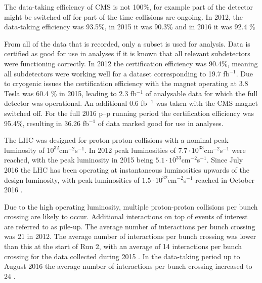 The data-taking efficiency of CMS is not 100\%, for example part of the detector might be
switched off for part of the time collisions are ongoing. In 2012, the data-taking 
efficiency was 93.5\%, in 2015 it was 90.3\% and in 2016 it was 92.4 \%

From all of the data that is recorded, only a subset is used for analysis. Data is 
certified as good for use in analyses if it is known that all relevant subdetectors
were functioning correctly. In 2012 the certification efficiency was 90.4\%,
meaning all subdetectors were working well for a dataset corresponding to 19.7 fb$^{-1}$.
Due to cryogenic issues the certification efficiency with the magnet operating
at 3.8 Tesla was 60.4 \% in 2015, leading to 2.3 fb$^{-1}$ of 
analysable data for which the full detector was operational. An additional 0.6 fb$^{-1}$
was taken with the \ac{CMS} magnet switched off. For the full 2016 p--p running period
the certification efficiency was 95.4\%, resulting in 36.26 fb$^{-1}$ of data marked good
for use in analyses.

The \ac{LHC} was designed for proton-proton collisions with a nominal
peak luminosity of $10^{32}$cm$^{-2}$s$^{-1}$. In 2012 peak
luminosities of $7.7\cdot10^{33}$cm$^{-2}$s$^{-1}$ were reached, with the peak luminosity in
2015 being $5.1\cdot10^{33}$cm$^{-2}$s$^{-1}$. Since July 2016
the \ac{LHC} has been operating at instantaneous luminosities upwards of the 
design luminosity, with peak luminosities of $1.5\cdot10^{32}$cm$^{-2}$s$^{-1}$ reached
in October 2016 \cite{cms-lumi-public}.

Due to the high operating luminosity, multiple proton-proton collisions per 
bunch crossing are likely to occur. Additional interactions on top of events of 
interest are referred to as pile-up. The average number of interactions
per bunch crossing was 21 in 2012\cite{cms-lumi-public}. The average number of
interactions per bunch crossing was lower than this at the start of Run 2, with
an average of 14 interactions per bunch crossing for the data collected
during 2015 \cite{CMS-PAS-HIG-16-006}. In the data-taking period up to August 2016 the average number of interactions
per bunch crossing increased to 24 \cite{CMS-PAS-HIG-16-037}.

